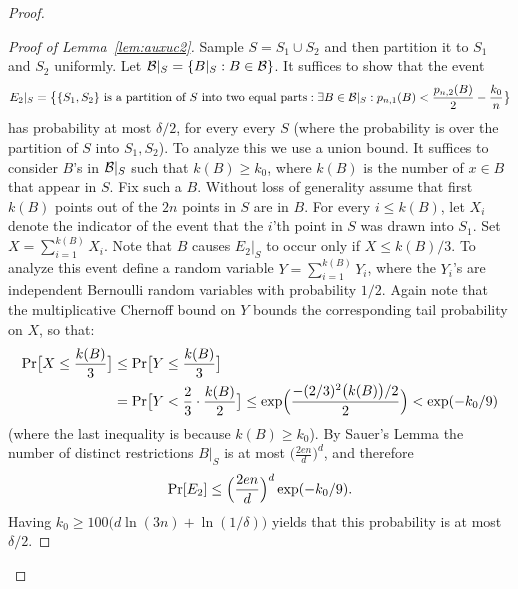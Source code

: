 \documentclass{article}
\newcommand{\B}{{\cal B}}
\newcommand{\samp}{S}
\newcommand{\new}[1]{\textcolor{red}{#1}}
\newcommand{\comment}[3]{\marginpar{\textcolor{#2}{#1: #3}}}
\newcommand{\shay}[1]{\comment{Shay}{red}{#1}}
\begin{document}
\begin{proof}
\begin{proof}[Proof of Lemma~\ref{lem:auxuc2}]
Sample $\samp=\samp_1\cup \samp_2$ and 
then partition it to $\samp_1$ and $\samp_2$ uniformly.
Let $\B|_{\samp} = \{B|_{\samp} : B\in\B\}$.
It suffices to show that the event
\[E_2|_{\samp} = 
\bigl\{ \{S_1,S_2\}\text{ is a partition of $S$ into two equal parts} :
\exists {B\in\B|_{\samp}}:
p_{n,1}(B) < \frac{p_{n,2}(B)}{2} - \frac{k_0}{n}
  \bigr\}
\]
has probability at most $\delta/2$, for every every $\samp$ 
(where the probability is over the partition of $\samp$ into $\samp_1,\samp_2$).
To analyze this we use a union bound. 
It suffices to consider $B$'s in $\B|_{\samp}$ such that $k(B) \geq k_0$,
where $k(B)$ is the number of $x\in B$ that appear in $S$.
Fix such a $B$.
Without loss of generality assume that
first $k(B)$ points out of the $2n$
points in $S$ are in $B$. 
For every $i\leq k(B)$,
let $X_i$ denote the indicator of the event
that the $i$'th point in $S$ was drawn into $S_1$.
Set~$X=\sum_{i=1}^{k(B)}X_i$.
Note that $B$ causes $E_2|_{\samp}$ to occur only if $X\leq k(B)/3$.
To analyze this event define a random variable $Y=\sum_{i=1}^{k(B)}Y_i$,
where the $Y_i$'s are independent Bernoulli random variables with probability $1/2$.
Again note that the multiplicative Chernoff bound on $Y$ bounds the corresponding tail probability on $X$, so that:
\shay{Here we should refer to the statement that sampling without repetitions is more concentrated.}
\begin{align*}
\Pr\bigl[X\leq \frac{k(B)}{3}\bigr]&\leq 
\Pr\bigl[Y\leq \frac{k(B)}{3}\bigr]\\
&=\Pr\bigl[Y < \frac{2}{3}\cdot\frac{k(B)}{2}\bigr]\leq
\exp\Bigl(\frac{-(2/3)^2\bigl(k(B)\bigr)/2}{2}\Bigr) < \exp(-k_0/9)
\end{align*}
(where the last inequality is because $k(B) \geq k_0$).
By Sauer's Lemma
the number of distinct restrictions $B|_S$ is at most $\bigl(\frac{2en}{d}\bigr)^d$, and therefore 
\[\Pr[E_2]\leq \Bigl(\frac{2en}{d}\Bigr)^d\exp(-k_0/9).\]
Having $k_0\geq 100\bigl(d\ln(3n) + \ln(1/\delta)\bigr)$ yields
that this probability is at most $\delta/2$.
\end{proof}
\end{proof}







%
\end{document}
